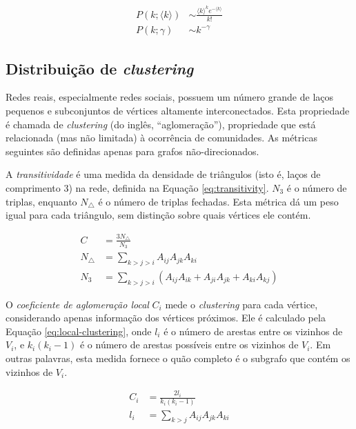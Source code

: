 \begin{align}
 P(k; \langle k \rangle) &\sim \frac{{\langle k \rangle}^k e^{-\langle k \rangle}}{k!} \label{eq:deg-poisson} \\
 P(k; \gamma) &\sim k^{-\gamma} \label{eq:deg-pareto}
\end{align}

\subsection{Distribuição de \textit{clustering}}

Redes reais, especialmente redes sociais, possuem um número grande de laços pequenos e subconjuntos de vértices 
altamente interconectados. Esta propriedade é chamada de \textit{clustering} (do inglês, ``aglomeração''),
propriedade que está relacionada (mas não limitada) à ocorrência de comunidades. As métricas seguintes 
são definidas apenas para grafos não-direcionados.

A \emph{transitividade} é uma medida da densidade de triângulos (isto é, laços de comprimento 3)
na rede, definida na Equação \ref{eq:transitivity}. $N_3$ é o número de triplas, enquanto $N_\bigtriangleup$
é o número de triplas fechadas. Esta métrica dá um peso igual para cada triângulo, sem distinção sobre quais 
vértices ele contém.

\begin{align}
 C &= \frac{3 N_\bigtriangleup}{N_3} \label{eq:transitivity} \\
 N_\bigtriangleup &= \sum_{k > j > i} A_{ij} A_{jk} A_{ki} \nonumber \\
 N_3 &= \sum_{k > j > i} (A_{ij} A_{ik} + A_{ji} A_{jk} + A_{ki} A_{kj}) \nonumber
\end{align}

O \emph{coeficiente de aglomeração local} $C_i$ mede o \textit{clustering} para cada vértice,
considerando apenas informação dos vértices próximos. Ele é calculado pela Equação \ref{eq:local-clustering}, onde $l_i$
é o número de arestas entre os vizinhos de $V_i$, e $k_i (k_i - 1)$ é o número de arestas
possíveis entre os vizinhos de $V_i$. Em outras palavras, esta medida fornece o quão completo é o subgrafo 
que contém os vizinhos de $V_i$.

\begin{align}
 C_i &= \frac{2 l_i}{k_i (k_i - 1)} \label{eq:local-clustering} \\
 l_i &= \sum_{k > j} A_{ij} A_{jk} A_{ki} \nonumber
\end{align}

